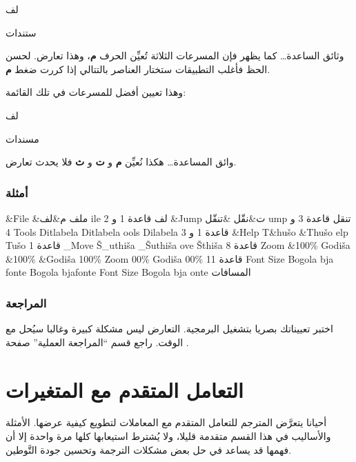 \startitemize[1]
\item {}لف
\item {}ستندات
\item وثائق الساعدة…
\stopitemize
كما يظهر فإن المسرعات الثلاثة تُعيِّن الحرف {\bf م}، وهذا تعارض. لحسن
الحظ فأغلب التطبيقات ستختار العناصر بالتتالي إذا كررت ضغط {\bf م}.

وهذا تعيين أفضل للمسرعات في تلك القائمة:

\startitemize[1]
\item {}لف
\item مسندات
\item وائق المساعدة…
\stopitemize
هكذا نُعيِّن {\bf م} و {\bf ت} و {\bf ث} فلا يحدث تعارض.

\subsubsection{أمثلة}
\starttable[|l|l|l|l|l|l|]
\HL
\NC {} \NC {}
\NC {} \NC {} \NC
{} \NC {}\NC\AR
\HL
\NC \&File \NC \&ملف \NC م\&لف \NC {}ile \NC {}لف
\NC قاعدة 1 و 2\NC\AR
\HL
\NC \&Jump \NC ت\&نقّل \NC \&تنقّل \NC {}ump \NC تنقل \NC
قاعدة 3 و 4\NC\AR
\HL
\NC {} Tools  \NC Di tlabela \NC {}
Ditlabela \NC {}ools \NC Dilabela \NC قاعدة 1 و
3\NC\AR
\HL
\NC \&Help \NC T\&hušo \NC \&Thušo \NC {}elp \NC
Tušo \NC قاعدة 1\NC\AR
\HL
\NC \_Move \NC Š\_uthiša \NC \_Šuthiša \NC {}ove \NC
Šthiša \NC قاعدة 8\NC\AR
\HL
\NC Zoom \&100\% \NC Godiša \&100\% \NC \&Godiša 100\% \NC Zoom
00\% \NC Godiša 00\% \NC قاعدة 11\NC\AR
\HL
\NC {} Font Size \NC Bogola bja  fonte \NC Bogola
bja fonte \NC Font Size \NC Bogola bja onte \NC
المسافات\NC\AR
\HL
\stoptable
\subsubsection{المراجعة}
اختبر تعييناتك بصريا بتشغيل البرمجية. التعارض ليس مشكلة كبيرة وغالبا
سيُحل مع الوقت. راجع قسم “المراجعة العملية” صفحة
\at[ref:34365426].

\section[ref:43252826]{التعامل المتقدم مع المتغيرات}
أحيانا يتعرَّض المترجم للتعامل
المتقدم مع المعاملات لتطويع كيفية عرضها. الأمثلة والأساليب في هذا القسم
متقدمة قليلا، ولا يُشترط استيعابها كلها مرة واحدة إلا أن فهمها قد يساعد
في حل بعض مشكلات الترجمة وتحسين جودة التَّوطين.

